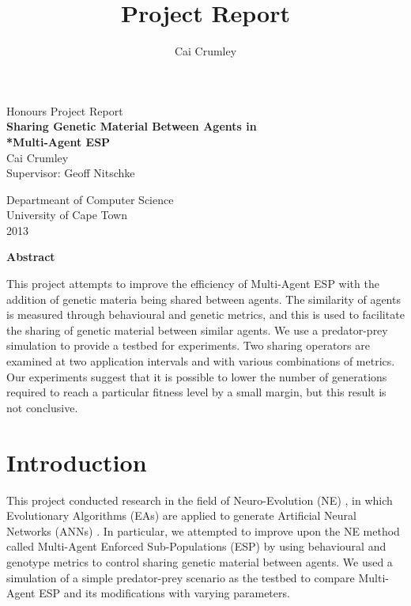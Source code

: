 \documentclass[12pt]{article} %
\title{Project Report}
\author{Cai Crumley}
\begin{document}
\begin{titlepage}
\begin{center}

{\LARGE Honours Project Report} \\[5cm]

{\Huge \bfseries Sharing Genetic Material Between Agents in \\*Multi-Agent ESP} \\[1.5cm]

{\Large Cai Crumley} \\[0.5cm]

{\Large Supervisor: Geoff Nitschke}

\vfill

{\large Departmeant of Computer Science}\\[0.25cm]
{\large University of Cape Town}\\[0.25cm]
{\large 2013}

\end{center}
\end{titlepage}

\thispagestyle{empty}
\begin{center}
{\LARGE \bfseries Abstract}\\[0.5cm]
\end{center}

This project attempts to improve the efficiency of Multi-Agent ESP with the addition of genetic materia being shared between agents. The similarity of agents is measured through behavioural and genetic metrics, and this is used to facilitate the sharing of genetic material between similar agents. We use a predator-prey simulation to provide a testbed for experiments. Two sharing operators are examined at two application intervals and with various combinations of metrics. Our experiments suggest that it is possible to lower the number of generations required to reach a particular fitness level by a small margin, but this result is not conclusive.

\newpage

\thispagestyle{empty}
\tableofcontents
\newpage

\thispagestyle{empty}
\listoftables
\newpage

\setcounter{page}{1}

\section{Introduction}

This project conducted research in the field of Neuro-Evolution (NE) \cite{Montana1989}, in which Evolutionary Algorithms (EAs) \cite{Back1993} are applied to generate Artificial Neural Networks (ANNs) \cite{Yegnanarayana2004}. In particular, we attempted to improve upon the NE method called Multi-Agent Enforced Sub-Populations (ESP) \cite{Moriarty1997}\cite{Yong2001} by using behavioural and genotype metrics to control sharing genetic material between agents. We used a simulation of a simple predator-prey scenario \cite{Gomez1997} as the testbed to compare Multi-Agent ESP and its modifications with varying parameters.
\end{document}
